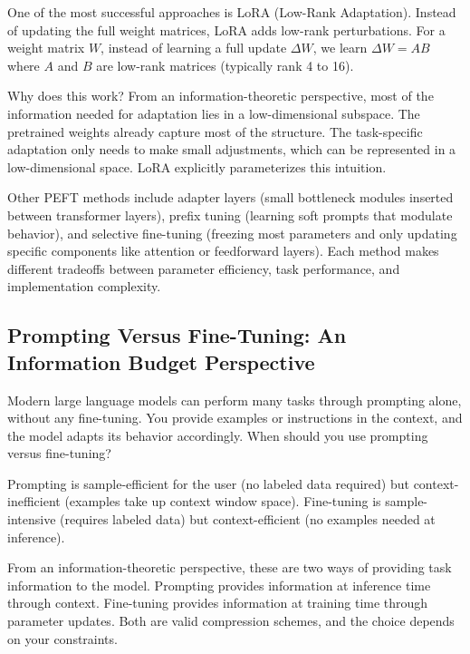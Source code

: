 One of the most successful approaches is LoRA (Low-Rank Adaptation). Instead of updating the full weight matrices, LoRA adds low-rank perturbations. For a weight matrix $W$, instead of learning a full update $\Delta W$, we learn $\Delta W = AB$ where $A$ and $B$ are low-rank matrices (typically rank 4 to 16).

Why does this work? From an information-theoretic perspective, most of the information needed for adaptation lies in a low-dimensional subspace. The pretrained weights already capture most of the structure. The task-specific adaptation only needs to make small adjustments, which can be represented in a low-dimensional space. LoRA explicitly parameterizes this intuition.

\vspace{1em}

Other PEFT methods include adapter layers (small bottleneck modules inserted between transformer layers), prefix tuning (learning soft prompts that modulate behavior), and selective fine-tuning (freezing most parameters and only updating specific components like attention or feedforward layers). Each method makes different tradeoffs between parameter efficiency, task performance, and implementation complexity.

\vspace{1.5em}

\subsection{Prompting Versus Fine-Tuning: An Information Budget Perspective}

Modern large language models can perform many tasks through prompting alone, without any fine-tuning. You provide examples or instructions in the context, and the model adapts its behavior accordingly. When should you use prompting versus fine-tuning?

Prompting is sample-efficient for the user (no labeled data required) but context-inefficient (examples take up context window space). Fine-tuning is sample-intensive (requires labeled data) but context-efficient (no examples needed at inference).

From an information-theoretic perspective, these are two ways of providing task information to the model. Prompting provides information at inference time through context. Fine-tuning provides information at training time through parameter updates. Both are valid compression schemes, and the choice depends on your constraints.

